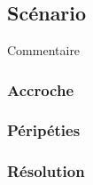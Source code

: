 \chapter{}
\keywords{}{}{}

\section{Scénario}

Commentaire

\subsection{Accroche}


\subsection{Péripéties}


\subsection{Résolution}
